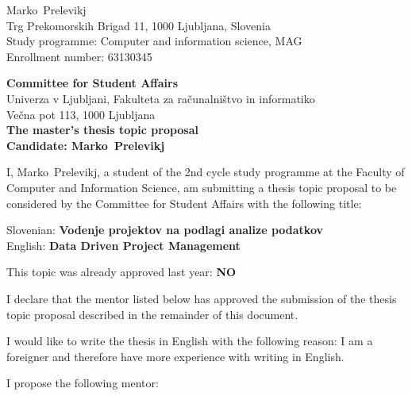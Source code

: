 \documentclass[a4paper, 12pt]{article}
\begin{document}
\newcommand{\ImeKandidata}{Marko} %
\newcommand{\PriimekKandidata}{Prelevikj} %
\newcommand{\VpisnaStevilka}{63130345} %
\newcommand{\StudyProgramme}{Computer and information science, MAG} %
\newcommand{\NaslovBivalisca}{Trg Prekomorskih Brigad 11, 1000 Ljubljana, Slovenia} %
\newcommand{\SLONaslov}{Vodenje projektov na podlagi analize podatkov} %
\newcommand{\ENGNaslov}{Data Driven Project Management} %


\newcommand{\Kandidat}{\ImeKandidata~\PriimekKandidata}
\noindent
\Kandidat\\
\NaslovBivalisca \\
Study programme: \StudyProgramme \\
Enrollment number: \VpisnaStevilka
\bigskip

{\bf Committee for Student Affairs}\\
Univerza v Ljubljani, Fakulteta za računalništvo in informatiko\\
Večna pot 113, 1000 Ljubljana\\

{\Large\bf
{\centering
    The master’s thesis topic proposal \\%
\large Candidate: \Kandidat \\[10mm]}}


I, \Kandidat, a student of the 2nd cycle study programme at the Faculty of Computer and Information Science, am submitting a thesis topic proposal to be considered by the Committee for Student Affairs with the following title:

Slovenian: {\bf \SLONaslov}\\
English: {\bf \ENGNaslov}

This topic was already approved last year: \textbf{NO}

I declare that the mentor listed below has approved the submission of the thesis topic proposal described in the remainder of this document.

I would like to write the thesis in English with the following reason: I am a foreigner and therefore have more experience with writing in English.

I propose the following mentor:
\end{document}
